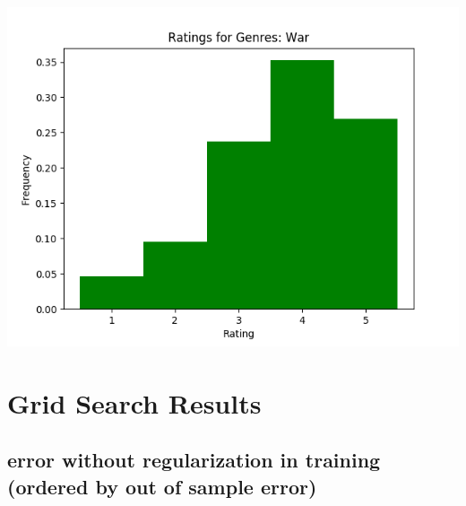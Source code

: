 \begin{appendices}
\begin{center}
\begin{minipage}{0.49\linewidth}
    \includegraphics[scale=0.5]{"Ratings for Genres: War"}
    \captionsetup{width=.75\linewidth}
  \end{minipage}
\end{center}

\pagebreak
\section{Grid Search Results}
\label{appendix:gridsearch}
\subsection{error without regularization in training (ordered by out of sample error)}


\end{appendices}
